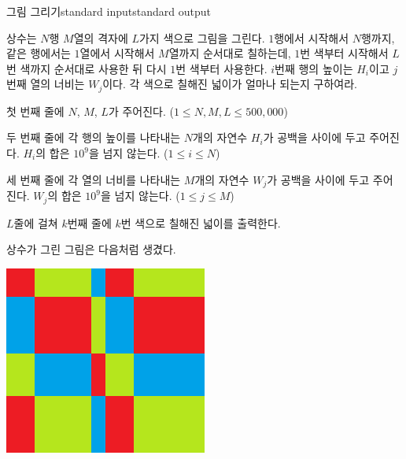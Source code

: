 \begin{problem}{그림 그리기}{standard input}{standard output}

상수는 $N$행 $M$열의 격자에 $L$가지 색으로 그림을 그린다. $1$행에서 시작해서 $N$행까지, 같은 행에서는 $1$열에서 시작해서 $M$열까지 순서대로 칠하는데, $1$번 색부터 시작해서 $L$번 색까지 순서대로 사용한 뒤 다시 $1$번 색부터 사용한다. $i$번째 행의 높이는 $H_i$이고 $j$번째 열의 너비는 $W_j$이다. 각 색으로 칠해진 넓이가 얼마나 되는지 구하여라.

\InputFile
첫 번째 줄에 $N$, $M$, $L$가 주어진다. ($1 \le N, M, L \le 500,000$)

두 번째 줄에 각 행의 높이를 나타내는 $N$개의 자연수 $H_i$가 공백을 사이에 두고 주어진다. $H_i$의 합은 $10^9$을 넘지 않는다. ($1 \le i \le N$)

세 번째 줄에 각 열의 너비를 나타내는 $M$개의 자연수 $W_j$가 공백을 사이에 두고 주어진다. $W_j$의 합은 $10^9$을 넘지 않는다. ($1 \le j \le M$)

\OutputFile
$L$줄에 걸쳐 $k$번째 줄에 $k$번 색으로 칠해진 넓이를 출력한다.

\Example

\begin{example}
%
\end{example}

\Notes

상수가 그린 그림은 다음처럼 생겼다.

\begin{center}
  \includegraphics[width=0.5\textwidth]{picture.png}
\end{center}

\end{problem}
